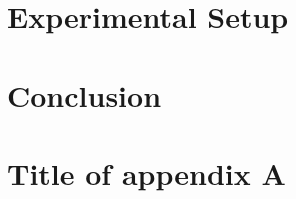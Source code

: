 \documentclass[oneside,12pt,bibliography=totoc]{scrbook}
\begin{document}
\chapter{Experimental Setup}
    

\chapter{Conclusion}
    
    

\backmatter
        
\printbibliography[title={References}]

\appendix
\chapter{Title of appendix A}


% 
\end{document}
